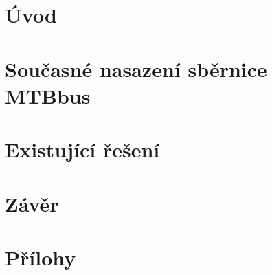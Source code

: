 \documentclass[digital, oneside, table, nolot, nolof]{fithesis3}
\begin{document}

\setlength{\parindent}{0cm}
\setlength{\parskip}{3mm plus2pt minus2pt}
\renewenvironment{compactenum}
	{\begin{enumerate}[leftmargin=8mm,itemsep=0pt,parsep=1pt,topsep=1pt,partopsep=1pt]}
	{\end{enumerate}}
\renewenvironment{compactitem}
	{\begin{itemize}[leftmargin=8mm,itemsep=0pt,parsep=0pt,topsep=1pt,partopsep=1pt]}
	{\end{itemize}}



\chapter{Úvod} \label{chap:uvod}


\chapter{Současné nasazení sběrnice MTBbus} \label{chap:nasazeni}


\chapter{Existující řešení} \label{chap:existujici-reseni}


\chapter{Závěr} \label{chap:zaver}


\printbibliography[heading=bibintoc]

\appendix
\chapter{Přílohy} \label{chap:appendix}

\end{document}
